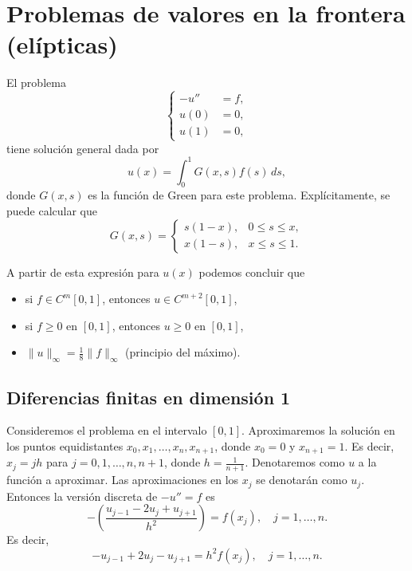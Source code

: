 \documentclass[11pt,letterpaper]{report}
\begin{document}
\chapter{Problemas de valores en la frontera (elípticas)}

El problema
\begin{equation}
  \left\{
    \begin{aligned}
      -u'' &= f, \\
      u(0) &= 0, \\
      u(1) &= 0,
    \end{aligned}
  \right.
\end{equation}
tiene solución general dada por
\begin{equation}
  u(x) = \int_{0}^{1}G(x,s)f(s)\,ds,
\end{equation}
donde $G(x,s)$ es la función de Green para este problema.
Explícitamente, se puede calcular que
\begin{equation}
  G(x,s)
  =
  \begin{cases}
    s(1-x), & 0\leq s\leq x, \\
    x(1-s), & x\leq s\leq 1.
  \end{cases}
\end{equation}

A partir de esta expresión para $u(x)$ podemos concluir que
\begin{itemize}
  \item
    si $f\in C^{m}[0,1]$, entonces $u\in C^{m+2}[0,1]$,
  \item
    si $f\geq 0$ en $[0,1]$, entonces $u\geq 0$ en $[0,1]$,
  \item
    $\|u\|_{\infty}=\frac{1}{8}\|f\|_\infty$ (principio del máximo).
\end{itemize}

\section{Diferencias finitas en dimensión 1}
Consideremos el problema en el intervalo $[0,1]$. Aproximaremos la
solución en los puntos equidistantes $x_0,x_1,\dots,x_n,x_{n+1}$,
donde $x_0=0$ y $x_{n+1}=1$. Es decir, $x_j=jh$ para
$j=0,1,\dots,n,n+1$, donde $h=\frac{1}{n+1}$.
Denotaremos como $u$ a la función a aproximar. Las aproximaciones en
los $x_j$ se denotarán como $u_j$. Entonces la versión discreta de
$-u''=f$ es
\begin{equation}
  - \left( \frac{u_{j-1}-2u_j+u_{j+1}}{h^{2}} \right)
    =
    f(x_j), \quad j=1,\dots,n
.\end{equation}
Es decir,
\begin{equation}
  - u_{j-1}+2u_j-u_{j+1}
    =
    h^{2} f(x_j), \quad j=1,\dots,n
.\end{equation}
\end{document}
